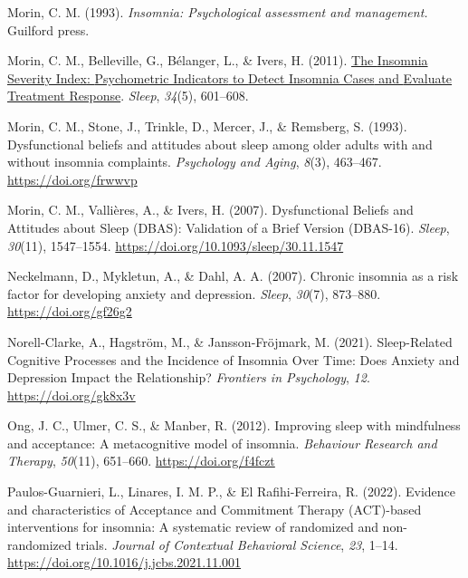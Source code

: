 \documentclass[
  ,doc,11pt, twoside,floatsintext]{apa6}
\newlength{\cslhangindent}
\newlength{\cslentryspacingunit} %
\newenvironment{CSLReferences}[2] %
 {%
  \setlength{\parindent}{0pt}
  \ifodd #1
  \let\oldpar\par
  \def\par{\hangindent=\cslhangindent\oldpar}
  \fi
  \setlength{\parskip}{#2\cslentryspacingunit}
 }%
 {}
\begin{document}
\begin{CSLReferences}{1}{0}
\leavevmode{}%
Morin, C. M. (1993). \emph{Insomnia: Psychological assessment and management.} Guilford press.

\leavevmode{}%
Morin, C. M., Belleville, G., Bélanger, L., \& Ivers, H. (2011). \href{https://www.ncbi.nlm.nih.gov/pmc/articles/PMC3079939}{The {Insomnia Severity Index}: {Psychometric Indicators} to {Detect Insomnia Cases} and {Evaluate Treatment Response}}. \emph{Sleep}, \emph{34}(5), 601--608.

\leavevmode{}%
Morin, C. M., Stone, J., Trinkle, D., Mercer, J., \& Remsberg, S. (1993). Dysfunctional beliefs and attitudes about sleep among older adults with and without insomnia complaints. \emph{Psychology and Aging}, \emph{8}(3), 463--467. \url{https://doi.org/frwwvp}

\leavevmode{}%
Morin, C. M., Vallières, A., \& Ivers, H. (2007). Dysfunctional {Beliefs} and {Attitudes} about {Sleep} ({DBAS}): {Validation} of a {Brief Version} ({DBAS-16}). \emph{Sleep}, \emph{30}(11), 1547--1554. \url{https://doi.org/10.1093/sleep/30.11.1547}

\leavevmode{}%
Neckelmann, D., Mykletun, A., \& Dahl, A. A. (2007). Chronic insomnia as a risk factor for developing anxiety and depression. \emph{Sleep}, \emph{30}(7), 873--880. \url{https://doi.org/gf26g2}

\leavevmode{}%
Norell-Clarke, A., Hagström, M., \& Jansson-Fröjmark, M. (2021). Sleep-{Related Cognitive Processes} and the {Incidence} of {Insomnia Over Time}: {Does Anxiety} and {Depression Impact} the {Relationship}? \emph{Frontiers in Psychology}, \emph{12}. \url{https://doi.org/gk8x3v}

\leavevmode{}%
Ong, J. C., Ulmer, C. S., \& Manber, R. (2012). Improving sleep with mindfulness and acceptance: {A} metacognitive model of insomnia. \emph{Behaviour Research and Therapy}, \emph{50}(11), 651--660. \url{https://doi.org/f4fczt}

\leavevmode{}%
Paulos-Guarnieri, L., Linares, I. M. P., \& El Rafihi-Ferreira, R. (2022). Evidence and characteristics of {Acceptance} and {Commitment Therapy} ({ACT})-based interventions for insomnia: {A} systematic review of randomized and non-randomized trials. \emph{Journal of Contextual Behavioral Science}, \emph{23}, 1--14. \url{https://doi.org/10.1016/j.jcbs.2021.11.001}


\end{CSLReferences}
\end{document}
